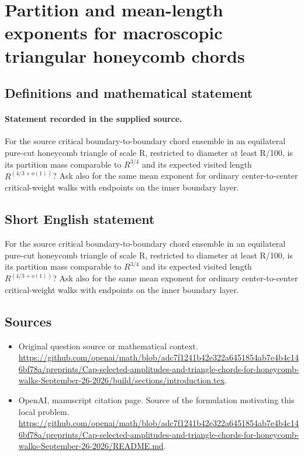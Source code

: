 \documentclass[11pt]{article}
\begin{document}
\section*{Partition and mean-length exponents for macroscopic triangular honeycomb chords}\label{30007371}
\subsection{Definitions and mathematical statement}
\paragraph{Statement recorded in the supplied source.}
For the source critical boundary-to-boundary chord ensemble in an equilateral pure-cut honeycomb triangle of scale R, restricted to diameter at least R/100, is its partition mass comparable to $R^{3/4}$ and its expected visited length $R^(4/3+o(1))$? Ask also for the same mean exponent for ordinary center-to-center critical-weight walks with endpoints on the inner boundary layer.
\subsection{Short English statement}
For the source critical boundary-to-boundary chord ensemble in an equilateral pure-cut honeycomb triangle of scale R, restricted to diameter at least R/100, is its partition mass comparable to $R^{3/4}$ and its expected visited length $R^(4/3+o(1))$? Ask also for the same mean exponent for ordinary center-to-center critical-weight walks with endpoints on the inner boundary layer.
\subsection{Sources}
\begin{itemize}
\item[S1] Original question source or mathematical context.
\url{https://github.com/openai/math/blob/adc7f1241b42e322a6451854ab7e4b4c146bf78a/preprints/Cap-selected-amplitudes-and-triangle-chords-for-honeycomb-walks-September-26-2026/build/sections/introduction.tex}.
\item[S2] OpenAI, manuscript citation page. Source of the formulation motivating this local problem.
\url{https://github.com/openai/math/blob/adc7f1241b42e322a6451854ab7e4b4c146bf78a/preprints/Cap-selected-amplitudes-and-triangle-chords-for-honeycomb-walks-September-26-2026/README.md}.
\end{itemize}
\end{document}
